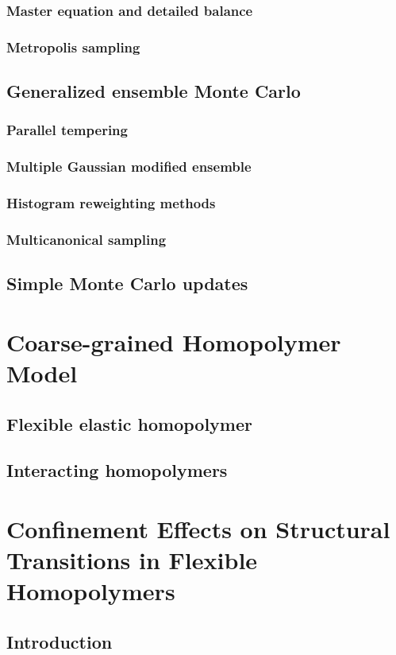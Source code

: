 \documentclass[12pt]{report}
\begin{document}
\subsection{Master equation and detailed balance}
\subsection{Metropolis sampling}
\section{Generalized ensemble Monte Carlo}
\subsection{Parallel tempering}
\subsection{Multiple Gaussian modified ensemble}
\subsection{Histogram reweighting methods}
\subsection{Multicanonical sampling}
\section{Simple Monte Carlo updates}

\chapter{Coarse-grained Homopolymer Model}
\section{Flexible elastic homopolymer}
\section{Interacting homopolymers}

\chapter{Confinement Effects on Structural Transitions in Flexible Homopolymers}
\section{Introduction}
\end{document}

